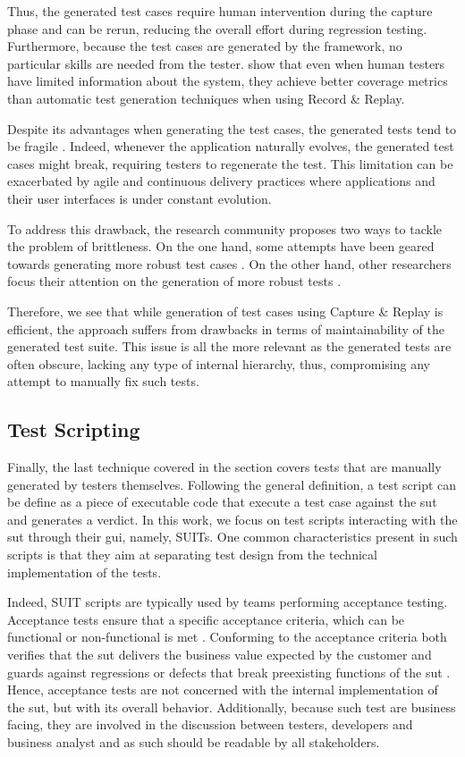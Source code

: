 Thus, the generated test cases require human intervention during the capture phase and can be rerun, reducing the overall effort during regression testing. Furthermore, because the test cases are generated by the framework, no particular skills are needed from the tester. \textcite{DiMartino2021} show that even when human testers have limited information about the system, they achieve better coverage metrics than automatic test generation techniques when using Record \& Replay.

Despite its advantages when generating the test cases, the generated tests tend to be fragile \cite{Hammoudi2016}. Indeed, whenever the application naturally evolves, the generated test cases might break, requiring testers to regenerate the test. This limitation can be exacerbated by agile and continuous delivery practices where applications and their user interfaces is under constant evolution.

To address this drawback, the research community proposes two ways to tackle the problem of brittleness. On the one hand, some attempts have been geared towards generating more robust test cases \cite{Hammoudi2016b}. On the other hand, other researchers focus their attention on the generation of more robust tests \cite{Ronsse1999}.

Therefore, we see that while generation of test cases using Capture \& Replay is efficient, the approach suffers from drawbacks in terms of maintainability of the generated test suite. This issue is all the more relevant as the generated tests are often obscure, lacking any type of internal hierarchy, thus, compromising any attempt to manually fix such tests. 

\subsection{Test Scripting}
\label{sec:introduction-test-scripting}

Finally, the last technique covered in the section covers tests that are manually generated by testers themselves. Following the general definition, a test script can be define as a piece of executable code that execute a test case against the \gls{sut} and generates a verdict. In this work, we focus on test scripts interacting with the \gls{sut} through their \gls{gui}, namely, SUITs. One common characteristics present in such scripts is that they aim at separating test design from the technical implementation of the tests.

Indeed, SUIT scripts are typically used by teams performing acceptance testing. Acceptance tests ensure that a specific acceptance criteria, which can be functional or non-functional is met \cite{Pandit2015}. Conforming to the acceptance criteria both verifies that the \gls{sut} delivers the business value expected by the customer and guards against regressions or defects that break preexisting functions of the \gls{sut} \cite{Humble2010}. Hence, acceptance tests are not concerned with the internal implementation of the \gls{sut}, but with its overall behavior. Additionally, because such test are business facing, they are involved in the discussion between testers, developers and business analyst and as such should be readable by all stakeholders.

